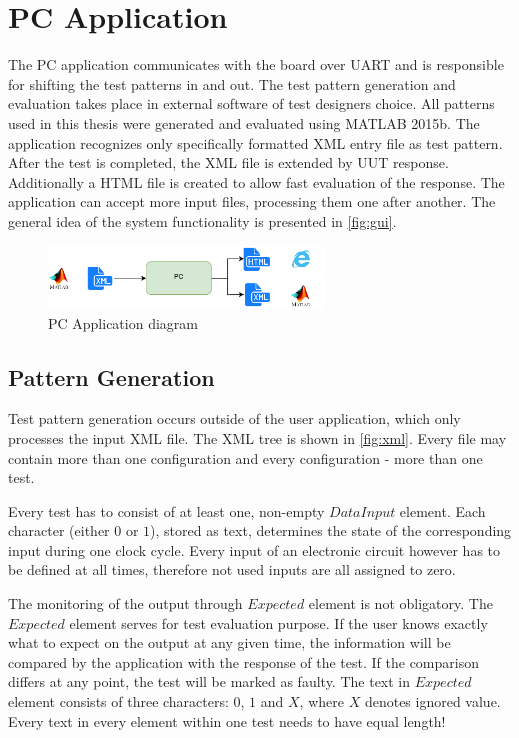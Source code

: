 \section{PC Application}

The PC application communicates with the board over UART and is responsible for shifting the test patterns in and out. The test pattern generation and evaluation takes place in external software of test designers choice. All patterns used in this thesis were generated and evaluated using MATLAB 2015b. The application recognizes only specifically formatted XML entry file as test pattern. After the test is completed, the XML file is extended by UUT response. Additionally a HTML file is created to allow fast evaluation of the response. The application can accept more input files, processing them one after another. The general idea of the system functionality is presented in \autoref{fig:gui}.

\begin{figure}[h]
\centering
\includegraphics[width=0.65\textwidth]{figures/PC.png}
\caption{PC Application diagram}
\label{fig:gui}
\end{figure}

\subsection{Pattern Generation}
Test pattern generation occurs outside of the user application, which only processes the input XML file. The XML tree is shown in \autoref{fig:xml}. Every file may contain more than one configuration and every configuration - more than one test.

Every test has to consist of at least one, non-empty $DataInput$ element. Each character (either $0$ or $1$), stored as text, determines the state of the corresponding input during one clock cycle. Every input of an electronic circuit however has to be defined at all times, therefore not used inputs are all assigned to zero.

The monitoring of the output through $Expected$ element is not obligatory. The $Expected$ element serves for test evaluation purpose. If the user knows exactly what to expect on the output at any given time, the information will be compared by the application with the response of the test. If the comparison differs at any point, the test will be marked as faulty. The text in $Expected$ element consists of three characters: $0$, $1$ and $X$, where $X$ denotes ignored value. Every text in every element within one test needs to have equal length!

